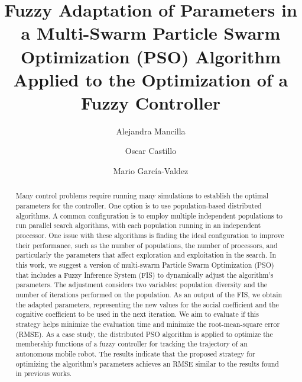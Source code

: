 \documentclass[runningheads]{llncs}
\begin{document}
%
\title{Fuzzy Adaptation of Parameters in a Multi-Swarm Particle Swarm Optimization (PSO) Algorithm Applied to the Optimization of a Fuzzy Controller } 

%
%
\author{Alejandra Mancilla \and
Oscar Castillo \and
Mario García-Valdez}
%
%

%
\maketitle              %
%
\begin{abstract}

     Many control problems require running many simulations to establish the optimal parameters for the controller. One option is to use population-based distributed algorithms. A common configuration is to employ multiple independent populations to run parallel search algorithms, with each population running in an independent processor. One issue with these algorithms is finding the ideal configuration to improve their performance, such as the number of populations, the number of processors, and particularly the parameters that affect exploration and exploitation in the search. In this work, we suggest a version of multi-swarm Particle Swarm Optimization (PSO) that includes a Fuzzy Inference System (FIS) to dynamically adjust the algorithm's parameters. The adjustment considers two variables: population diversity and the number of iterations performed on the population. As an output of the FIS, we obtain the adapted parameters, representing the new values for the social coefficient and the cognitive coefficient to be used in the next iteration. We aim to evaluate if this strategy helps minimize the evaluation time and minimize the root-mean-square error (RMSE). As a case study, the distributed PSO algorithm is applied to optimize the membership functions of a fuzzy controller for tracking the trajectory of an autonomous mobile robot. The results indicate that the proposed strategy for optimizing the algorithm's parameters achieves an RMSE similar to the results found in previous works.

\end{abstract}
%
%
\end{document}

